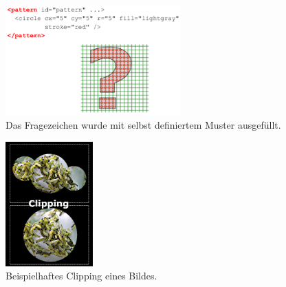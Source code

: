 \begin{figure}[h!]\centering
\includegraphics[width=0.6\textwidth]{pictures/pattern.png}
\caption{Das Fragezeichen wurde mit selbst definiertem Muster ausgefüllt.}
\label{fig:pattern}\end{figure}
\begin{figure}[h!]\centering
\includegraphics[width=0.3\textwidth]{pictures/kap14_1.jpg}
\caption{Beispielhaftes Clipping eines Bildes.}
\label{fig:clip}\end{figure}

\newpage